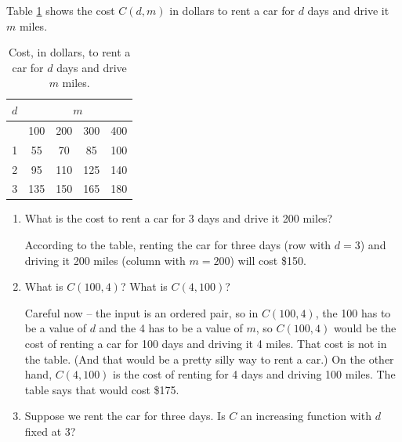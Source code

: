 \begin{example}
Table \ref{tab:4-1-rentcar} shows the cost $C(d,m)$ in dollars to rent a car for $d$ days and drive it $m$ miles.

\begin{table}[ht!]
\centering
    \begin{tabular}{*{5}{c}}
    $d$ & \multicolumn{4}{c}{$m$} \\
    \toprule
        & 100 & 200 & 300 & 400\\
    \midrule
    1   &  55 &  70 &  85 & 100\\
    2   &  95 & 110 & 125 & 140\\
    3   & 135 & 150 & 165 & 180\\
    \bottomrule
    \end{tabular}
    \caption{Cost, in dollars, to rent a car for $d$ days and drive $m$ miles.}
    \label{tab:4-1-rentcar}
\end{table}
\begin{enumerate}[label=(\alph*)]
    \item What is the cost to rent a car for 3 days and drive it 200 miles?

    \begin{solution}
    According to the table, renting the car for three days (row with $d=3$) and driving it 200 miles (column with $m=200$) will cost \$150.
    \end{solution}
    \item What is $C(100,4)$? What is $C(4,100)$?

    \begin{solution}
    Careful now -- the input is an ordered pair, so in $C(100,4)$, the 100 has to be a value of $d$ and the 4 has to be a value of $m$, so $C(100,4)$ would be the cost of renting a car for 100 days and driving it 4 miles. That cost is not in the table. (And that would be a pretty silly way to rent a car.) On the other hand, $C(4,100)$ is the cost of renting for 4 days and driving 100 miles. The table says that would cost \$175.
    \end{solution}
    \item Suppose we rent the car for three days. Is $C$ an increasing function with $d$ fixed at 3?


\end{enumerate}
\end{example}
